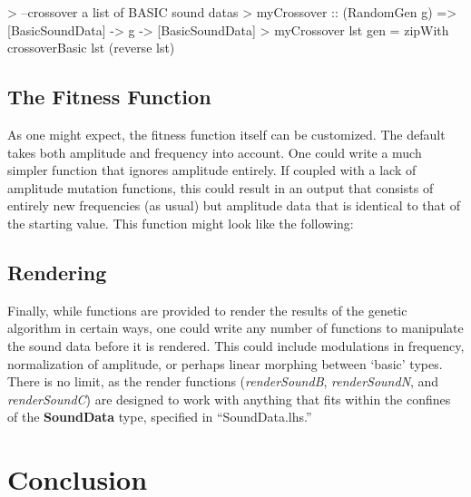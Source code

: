 \documentclass[11pt]{article}
\begin{document}
\begin{code}
> --crossover a list of BASIC sound datas
> myCrossover :: (RandomGen g) => [BasicSoundData] -> g -> [BasicSoundData]
> myCrossover lst gen = zipWith crossoverBasic lst (reverse lst)
\end{code}

\subsection{The Fitness Function}

As one might expect, the fitness function itself can be customized. The default takes both amplitude and frequency into account. One could write a much simpler function that ignores amplitude entirely. If coupled with a lack of amplitude mutation functions, this could result in an output that consists of entirely new frequencies (as usual) but amplitude data that is identical to that of the starting value. This function might look like the following:


\subsection{Rendering}

Finally, while functions are provided to render the results of the genetic algorithm in certain ways, one could write any number of functions to manipulate the sound data before it is rendered. This could include modulations in frequency, normalization of amplitude, or perhaps linear morphing between `basic' types. There is no limit, as the render functions (\emph{renderSoundB}, \emph{renderSoundN}, and \emph{renderSoundC}) are designed to work with anything that fits within the confines of the {\bf SoundData} type, specified in ``SoundData.lhs.''

\section{Conclusion}
\end{document}
